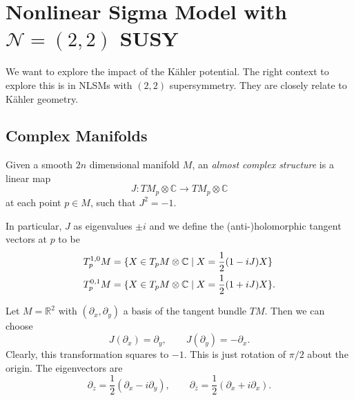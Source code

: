 
\chapter{Nonlinear Sigma Model with \texorpdfstring{$\mathcal{N} = (2, 2)$}{N=(2, 2)} SUSY}%
\label{cha:nonlinear_sigma_model_with_susy}

We want to explore the impact of the Kähler potential. The right context to explore this is in NLSMs with $(2, 2)$ supersymmetry. They are closely relate to Kähler geometry.

\section{Complex Manifolds}%
\label{sec:almost_complex_strucutres}

\begin{definition}
  Given a smooth $2n$ dimensional manifold $M$, an \emph{almost complex structure} is a linear map
  \begin{equation}
    J \colon TM_p \otimes \mathbb{C} \to TM_p \otimes \mathbb{C}
  \end{equation}
  at each point $p \in M$, such that $J^2 = -1$.
\end{definition}
\begin{definition}
  In particular, $J$ as eigenvalues $\pm i$ and we define the (anti-)holomorphic tangent vectors at $p$ to be
  \begin{align}
    T_p^{1, 0}M &= \{X \in T_p M \otimes \mathbb{C} \suchthat X = \frac{1}{2} (1 - i J) X\} \\
    T_p^{0,1}M &= \{X \in T_p M \otimes \mathbb{C} \suchthat X = \frac{1}{2} (1 + i J) X\}.
  \end{align}
\end{definition}

\begin{example}[]
  Let $M = \mathbb{R}^2$ with $(\partial_x, \partial_y)$ a basis of the tangent bundle $T M$. Then we can choose 
  \begin{equation}
    J (\partial_x) = \partial_y, \qquad J(\partial_y) = -\partial_x.
  \end{equation}
  Clearly, this transformation squares to $-1$. This is just rotation of $\pi / 2$ about the origin.
  The eigenvectors are 
  \begin{equation}
    \partial_z = \frac{1}{2} (\partial_x - i \partial_y), \qquad \partial_{\overline{z}{}} = \frac{1}{2} (\partial_x + i \partial_x).
  \end{equation}
\end{example}

